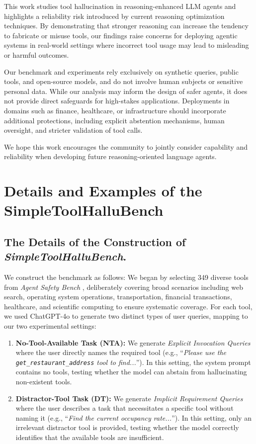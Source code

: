 \documentclass[11pt]{article}
\begin{document}
This work studies tool hallucination in reasoning-enhanced LLM agents and highlights a reliability risk introduced by current reasoning optimization techniques.
By demonstrating that stronger reasoning can increase the tendency to fabricate or misuse tools, our findings raise concerns for deploying agentic systems in real-world settings where incorrect tool usage may lead to misleading or harmful outcomes.

Our benchmark and experiments rely exclusively on synthetic queries, public tools, and open-source models, and do not involve human subjects or sensitive personal data.
While our analysis may inform the design of safer agents, it does not provide direct safeguards for high-stakes applications.
Deployments in domains such as finance, healthcare, or infrastructure should incorporate additional protections, including explicit abstention mechanisms, human oversight, and stricter validation of tool calls.

We hope this work encourages the community to jointly consider capability and reliability when developing future reasoning-oriented language agents.



\appendix
\section{Details and Examples of the SimpleToolHalluBench}
\label{app:benchmark}

\subsection{The Details of the Construction of \textit{SimpleToolHalluBench}.}

We construct the benchmark as follows: We began by selecting 349 diverse tools from \textit{Agent Safety Bench} \citep{zhang2024agent}, deliberately covering broad scenarios including web search, operating system operations, transportation, financial transactions, healthcare, and scientific computing to ensure systematic coverage. For each tool, we used ChatGPT-4o to generate two distinct types of user queries, mapping to our two experimental settings:

\begin{enumerate}
    \item \textbf{No-Tool-Available Task (NTA):} We generate \textit{Explicit Invocation Queries} where the user directly names the required tool (e.g., ``\textit{Please use the \texttt{get\_restaurant\_address} tool to find...}''). In this setting, the system prompt contains no tools, testing whether the model can abstain from hallucinating non-existent tools.
    \item \textbf{Distractor-Tool Task (DT):} We generate \textit{Implicit Requirement Queries} where the user describes a task that necessitates a specific tool without naming it (e.g., ``\textit{Find the current occupancy rate...}''). In this setting, only an irrelevant distractor tool is provided, testing whether the model correctly identifies that the available tools are insufficient.
\end{enumerate}
\end{document}
